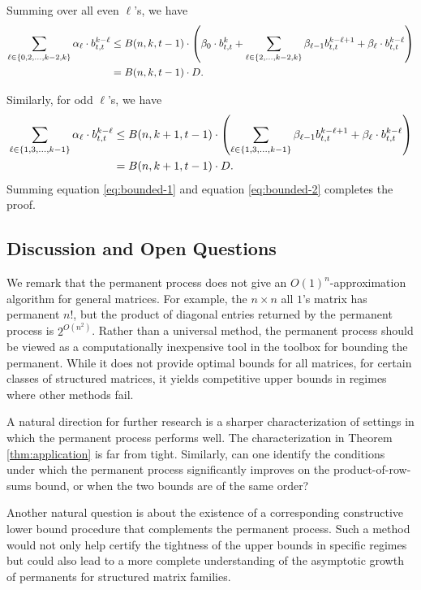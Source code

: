 \documentclass[11pt]{article}
\makeatletter
\theoremstyle{definition}
\newenvironment{proof}[1][\protect\proofname]{\par
	\normalfont\topsep6\p@\@plus6\p@\relax
	\trivlist
	\itemindent\parindent        %
	\item[\hskip\labelsep\scshape #1]\ignorespaces
}{%
	\endtrivlist\@endpefalse
}
\providecommand{\proofname}{Proof}
\makeatother
\begin{document}
\begin{proof}
    
    Summing over all even $\ell$'s, we have
    \begin{align}
        \sum_{\ell \in \{0, 2, \ldots, k-2, k\}} \alpha_{\ell} \cdot b_{t,t}^{k-\ell} &\leq B(n, k, t-1) \cdot \left(\beta_0 \cdot b_{t,t}^k + \sum_{\ell \in \{2, \ldots, k-2, k\}} \beta_{\ell-1} b_{t,t}^{k-\ell+1} +   \beta_{\ell} \cdot b_{t,t}^{k-\ell} \right) \notag\\
        &= B(n, k, t-1)  \cdot D. \label{eq:bounded-1}
    \end{align}

    Similarly, for odd $\ell$'s, we have
 \begin{align}
        \sum_{\ell \in \{1, 3, \ldots, k-1\}} \alpha_{\ell} \cdot b_{t,t}^{k-\ell} &\leq B(n, k+1, t-1) \cdot \left(\sum_{\ell \in \{1, 3, \ldots, k-1\}} \beta_{\ell-1} b_{t,t}^{k-\ell+1} +   \beta_{\ell} \cdot b_{t,t}^{k-\ell} \right) \notag\\
        &= B(n, k+1, t-1) \cdot D.\label{eq:bounded-2}
    \end{align}
    Summing equation \eqref{eq:bounded-1} and equation \eqref{eq:bounded-2} completes the proof.
\end{proof}

\subsection{Discussion and Open Questions}
We remark that the permanent process does not give an $O(1)^n$-approximation algorithm for general matrices. For example, the $n \times n$ all $1$'s matrix has permanent $n!$, but the product of diagonal entries returned by the permanent process is $2^{O(n^2)}$. Rather than a universal method, the permanent process should be viewed as a computationally inexpensive tool in the toolbox for bounding the permanent. While it does not provide optimal bounds for all matrices, for certain classes of structured matrices, it yields competitive upper bounds in regimes where other methods fail.

A natural direction for further research is a sharper characterization of settings in which the permanent process performs well. The characterization in Theorem \ref{thm:application} is far from tight. Similarly, can one identify the conditions under which the permanent process significantly improves on the product-of-row-sums bound, or when the two bounds are of the same order?

Another natural question is about the existence of a corresponding constructive lower bound procedure that complements the permanent process. Such a method would not only help certify the tightness of the upper bounds in specific regimes but could also lead to a more complete understanding of the asymptotic growth of permanents for structured matrix families.
\end{document}
